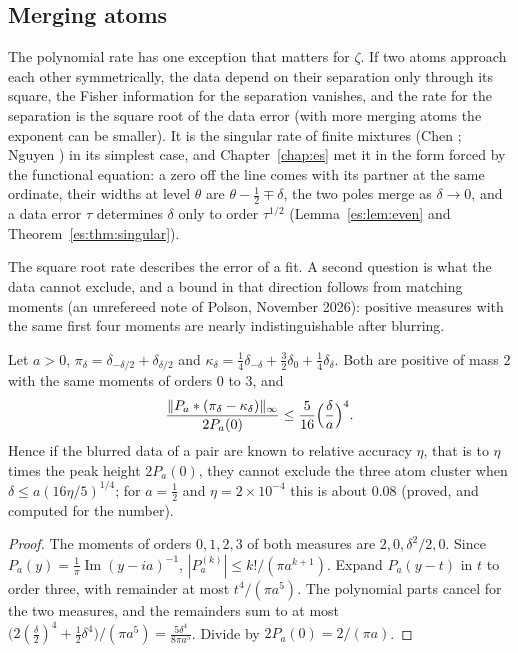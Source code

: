 \subsection{Merging atoms}

The polynomial rate has one exception that matters for $\zeta$. If two atoms approach each other symmetrically, the data depend on their separation only through its square, the Fisher information for the separation vanishes, and the rate for the separation is the square root of the data error (with more merging atoms the exponent can be smaller). It is the singular rate of finite mixtures (Chen \cite{Chen95}; Nguyen \cite{Nguyen13}) in its simplest case, and Chapter~\ref{chap:es} met it in the form forced by the functional equation: a zero off the line comes with its partner at the same ordinate, their widths at level $\theta$ are $\theta-\tfrac12\mp\delta$, the two poles merge as $\delta\to0$, and a data error $\tau$ determines $\delta$ only to order $\tau^{1/2}$ (Lemma~\ref{es:lem:even} and Theorem~\ref{es:thm:singular}).

The square root rate describes the error of a fit. A second question is what the data cannot exclude, and a bound in that direction follows from matching moments (an unrefereed note of Polson, November 2026): positive measures with the same first four moments are nearly indistinguishable after blurring.

\begin{proposition}\label{cd:prop:cluster}
Let $a>0$, $\pi_\delta=\delta_{-\delta/2}+\delta_{\delta/2}$ and $\kappa_\delta=\tfrac14\delta_{-\delta}+\tfrac32\delta_0+\tfrac14\delta_\delta$. Both are positive of mass $2$ with the same moments of orders $0$ to $3$, and
\[
\frac{\|P_a*(\pi_\delta-\kappa_\delta)\|_\infty}{2P_a(0)}\le\frac5{16}\Bigl(\frac\delta a\Bigr)^4.
\]
Hence if the blurred data of a pair are known to relative accuracy $\eta$, that is to $\eta$ times the peak height $2P_a(0)$, they cannot exclude the three atom cluster when $\delta\le a(16\eta/5)^{1/4}$; for $a=\tfrac12$ and $\eta=2\times10^{-4}$ this is about $0.08$ (proved, and computed for the number).
\end{proposition}

\begin{proof}
The moments of orders $0,1,2,3$ of both measures are $2,0,\delta^2/2,0$. Since $P_a(y)=\frac1\pi\operatorname{Im}(y-ia)^{-1}$, $|P_a^{(k)}|\le k!/(\pi a^{k+1})$. Expand $P_a(y-t)$ in $t$ to order three, with remainder at most $t^4/(\pi a^5)$. The polynomial parts cancel for the two measures, and the remainders sum to at most $\bigl(2(\tfrac\delta2)^4+\tfrac12\delta^4\bigr)/(\pi a^5)=\frac{5\delta^4}{8\pi a^5}$. Divide by $2P_a(0)=2/(\pi a)$.
\end{proof}

